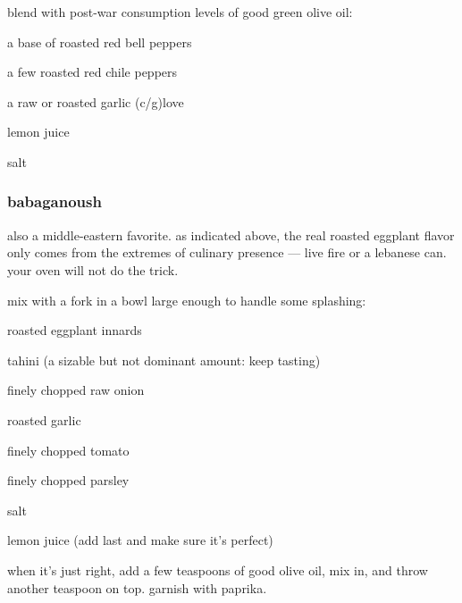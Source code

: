 blend with post-war consumption levels of good green olive oil:

\begin{ingredients}
  \item a base of roasted red bell peppers
  \item a few roasted red chile peppers
  \item a raw or roasted garlic (c/g)love
  \item lemon juice
  \item salt
\end{ingredients}

\subsubsection{\gls{babaganoush}}

also a middle-eastern favorite. as indicated above, the real roasted eggplant 
flavor only comes from the extremes of culinary presence --- live fire or a 
lebanese can. your oven will not do the trick.

mix with a fork in a bowl large enough to handle some splashing:

\begin{ingredients}
  \item roasted eggplant innards
  \item tahini (a sizable but not dominant amount: keep tasting)
  \item finely chopped raw onion
  \item roasted garlic
  \item finely chopped tomato
  \item finely chopped parsley
  \item salt
  \item lemon juice (add last and make sure it's perfect)
\end{ingredients}

when it's just right, add a few teaspoons of good olive oil, mix in, and throw 
another teaspoon on top. garnish with paprika.
